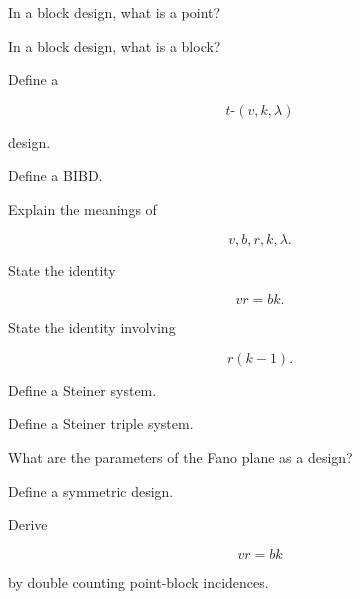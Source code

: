 \begin{exercise}[1]
In a block design, what is a point?
\end{exercise}

\begin{exercise}[1]
In a block design, what is a block?
\end{exercise}

\begin{exercise}[1]
Define a

\[
t\text{-}(v,k,\lambda)
\]

design.
\end{exercise}

\begin{exercise}[1]
Define a BIBD.
\end{exercise}

\begin{exercise}[1]
Explain the meanings of

\[
v,b,r,k,\lambda.
\]
\end{exercise}

\begin{exercise}[1]
State the identity

\[
vr=bk.
\]
\end{exercise}

\begin{exercise}[1]
State the identity involving

\[
r(k-1).
\]
\end{exercise}

\begin{exercise}[1]
Define a Steiner system.
\end{exercise}

\begin{exercise}[1]
Define a Steiner triple system.
\end{exercise}

\begin{exercise}[1]
What are the parameters of the Fano plane as a design?
\end{exercise}

\begin{exercise}[1]
Define a symmetric design.
\end{exercise}

\begin{exercise}[2]
Derive

\[
vr=bk
\]

by double counting point-block incidences.
\end{exercise}

